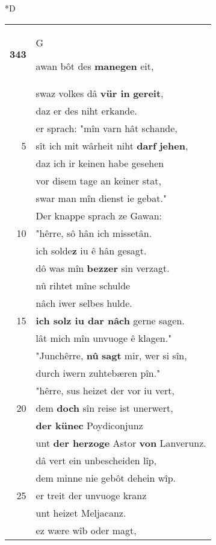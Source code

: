 \documentclass[8pt,a4paper,notitlepage]{article}
\begin{document}
\begin{table}[ht]
\begin{minipage}[t]{0.5\linewidth}
\small
\begin{center}*D
\end{center}
\begin{tabular}{rl}
\textbf{343} & \begin{large}G\end{large}awan bôt des \textbf{manegen} eit,\\ 
 & swaz volkes dâ \textbf{vür in} \textbf{gereit},\\ 
 & daz er des niht erkande.\\ 
 & er sprach: "mîn varn hât schande,\\ 
5 & sît ich mit wârheit niht \textbf{darf} \textbf{jehen},\\ 
 & daz ich ir keinen habe gesehen\\ 
 & vor disem tage an keiner stat,\\ 
 & swar man mîn dienst ie gebat."\\ 
 & Der knappe sprach ze Gawan:\\ 
10 & "hêrre, sô hân ich missetân.\\ 
 & ich solde\textbf{z} iu ê hân gesagt.\\ 
 & dô was mîn \textbf{bezzer} sin verzagt.\\ 
 & nû rihtet mîne schulde\\ 
 & nâch iwer selbes hulde.\\ 
15 & \textbf{ich solz iu dar nâch} gerne sagen.\\ 
 & lât mich mîn unvuoge ê klagen."\\ 
 & "Junchêrre, \textbf{nû} \textbf{sagt} mir, wer si sîn,\\ 
 & durch iwern zuhtebæren pîn."\\ 
 & "hêrre, sus heizet der vor iu vert,\\ 
20 & dem \textbf{doch} sîn reise ist unerwert,\\ 
 & \textbf{der künec} Poydiconjunz\\ 
 & unt \textbf{der herzoge} Astor \textbf{von} Lanverunz.\\ 
 & dâ vert ein unbescheiden lîp,\\ 
 & dem minne nie gebôt dehein wîp.\\ 
25 & er treit der unvuoge kranz\\ 
 & unt heizet Meljacanz.\\ 
 & ez wære wîb oder magt,\\ 

\end{tabular}
\end{minipage}
\end{table}
\end{document}
